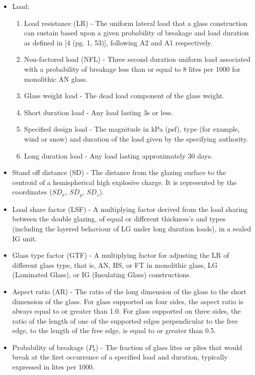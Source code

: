 \documentclass[12pt]{article}
\begin{document}
\begin{itemize}
\begin{enumerate}
\end{enumerate}
\item{Load:}
\begin{enumerate}
\item{Load resistance (LR) - The uniform lateral load that a glass construction can sustain based upon a given probability of breakage and load duration as defined in [4 (pg. 1, 53)], following A2 and A1 respectively.}
\item{Non-factored load (NFL) - Three second duration uniform load associated with a probability of breakage less than or equal to 8 lites per 1000 for monolithic AN glass.}
\item{Glass weight load - The dead load component of the glass weight.}
\item{Short duration load - Any load lasting 3s or less.}
\item{Specified design load - The magnitude in kPa (psf), type (for example, wind or snow) and duration of the load given by the specifying authority.}
\item{Long duration load - Any load lasting approximately 30 days.}
\end{enumerate}
\item{Stand off distance (SD) - The distance from the glazing surface to the centroid of a hemispherical high explosive charge. It is represented by the coordinates ($SD_{x}$, $SD_{y}$, $SD_{z}$).}
\item{Load share factor (LSF) - A multiplying factor derived from the load sharing between the double glazing, of equal or different thickness's and types (including the layered behaviour of LG under long duration loads), in a sealed IG unit.}
\item{Glass type factor (GTF) - A multiplying factor for adjusting the LR of different glass type, that is, AN, HS, or FT in monolithic glass, LG (Laminated Glass), or IG (Insulating Glass) constructions.}
\item{Aspect ratio (AR) - The ratio of the long dimension of the glass to the short dimension of the glass. For glass supported on four sides, the aspect ratio is always equal to or greater than 1.0. For glass supported on three sides, the ratio of the length of one of the supported edges perpendicular to the free edge, to the length of the free edge, is equal to or greater than 0.5.}
\item{Probability of breakage ($P_{b}$) - The fraction of glass lites or plies that would break at the first occurrence of a specified load and duration, typically expressed in lites per 1000.}
\end{itemize}
\end{document}
